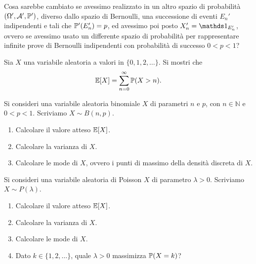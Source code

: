 Cosa sarebbe cambiato se avessimo realizzato in un altro spazio di probabilità $( \Omega ' ,\mathcal{A} ' ,\mathbb{P} ' )$, diverso dallo spazio di Bernoulli, una successione di eventi $E_{n} ' $ indipendenti e tali che $\mathbb{P} ' ( E_{n} ' ) =p$, ed avessimo poi posto $X_{n} ' =\Ind_{E_{n} ' }$, ovvero se avessimo usato un differente spazio di probabilità per rappresentare infinite prove di Bernoulli indipendenti con probabilità di successo $0< p< 1$?
\Esercizio{$\star$}

Sia $X$ una variabile aleatoria a valori in $\{0,1,2,\dots \}$. Si mostri che
\begin{equation*}
\mathbb{E}[ X] =\sum\limits _{n=0}^{\infty }\mathbb{P}( X >n) .
\end{equation*}

Si consideri una variabile aleatoria binomiale $X$ di parametri $n$ e $p$, con $n\in \mathbb{N}$ e $0< p< 1$. Scriviamo $X\sim B( n,p)$.
\begin{enumerate}
\item Calcolare il valore atteso $\mathbb{E}[ X]$.
\item Calcolare la varianza di $X$.
\item Calcolare le mode di $X$, ovvero i punti di massimo della densità discreta di $X$.
\end{enumerate}

Si consideri una variabile aleatoria di Poisson $X$ di parametro $\lambda  >0$. Scriviamo $X\sim P( \lambda )$.
\begin{enumerate}
\item Calcolare il valore atteso $\mathbb{E}[ X]$.
\item Calcolare la varianza di $X$.
\item Calcolare le mode di $X$.
\item Dato $k\in \{1,2,\dots \}$, quale $\lambda  >0$ massimizza $\mathbb{P}( X=k)$?
\end{enumerate}

